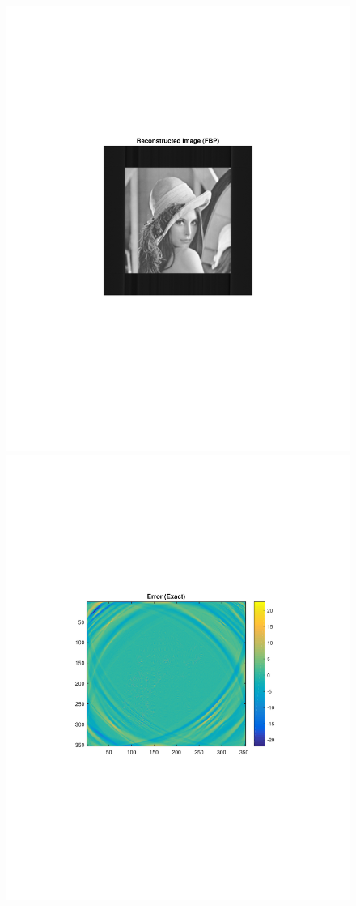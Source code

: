 \documentclass{UCF_ETD}
\begin{document}
\begin{figure}[H]
\begin{center}
 \includegraphics[scale=0.7]{PolarSphericalDFT/CornerCompensatedPaddedReconstructionFBP}
 \includegraphics[scale=0.6]{PolarSphericalDFT/CornerCompensatedPaddedReconstructionError}

\end{center}
\end{figure}
\end{document}
